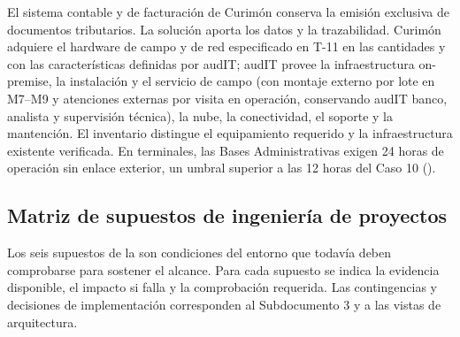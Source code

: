 El sistema contable y de facturación de Curimón conserva la emisión exclusiva de documentos tributarios. La solución aporta los datos y la trazabilidad. Curimón adquiere el hardware de campo y de red especificado en T-11 en las cantidades y con las características definidas por audIT; audIT provee la infraestructura on-premise, la instalación y el servicio de campo (con montaje externo por lote en M7--M9 y atenciones externas por visita en operación, conservando audIT banco, analista y supervisión técnica), la nube, la conectividad, el soporte y la mantención. El inventario distingue el equipamiento requerido y la infraestructura existente verificada. En terminales, las Bases Administrativas exigen 24 horas de operación sin enlace exterior, un umbral superior a las 12 horas del Caso 10 ().

\subsection{Matriz de supuestos de ingeniería de proyectos}\label{sec:2-supuestos-matriz}

Los seis supuestos de la  son condiciones del entorno que todavía deben comprobarse para sostener el alcance. Para cada supuesto se indica la evidencia disponible, el impacto si falla y la comprobación requerida. Las contingencias y decisiones de implementación corresponden al Subdocumento 3 y a las vistas de arquitectura.

